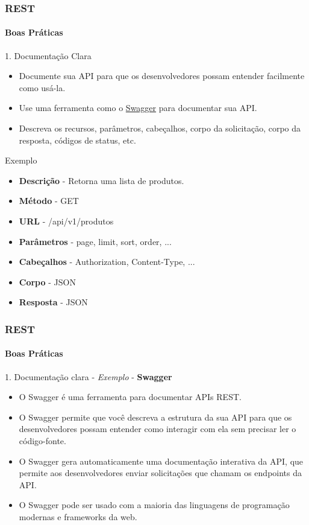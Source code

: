 \documentclass[
	9pt, %
	t, %
]{beamer}
\begin{document}
\begin{frame}
	\frametitle{REST}
	\framesubtitle{Boas Práticas}

	\begin{block}{1. Documentação Clara}
		\begin{itemize}
			\item Documente sua API para que os desenvolvedores possam entender facilmente como usá-la.
			\item Use uma ferramenta como o \href{https://swagger.io/}{Swagger} para documentar sua API.
			\item Descreva os recursos, parâmetros, cabeçalhos, corpo da solicitação, corpo da resposta, códigos de status, etc.
		\end{itemize}
	\end{block}

	\begin{exampleblock}{Exemplo}
		\begin{itemize}
			\item \textbf{Descrição} - Retorna uma lista de produtos.
			\item \textbf{Método} - GET
			\item \textbf{URL} - /api/v1/produtos
			\item \textbf{Parâmetros} - page, limit, sort, order, ...
			\item \textbf{Cabeçalhos} - Authorization, Content-Type, ...
			\item \textbf{Corpo} - JSON
			\item \textbf{Resposta} - JSON
		\end{itemize}
	\end{exampleblock}

\end{frame}

\begin{frame}
	\frametitle{REST}
	\framesubtitle{Boas Práticas}

	\begin{block}{1. Documentação clara - \textit{Exemplo} - \textbf{Swagger}}
		\begin{itemize}
			\item O Swagger é uma ferramenta para documentar APIs REST.
			\item O Swagger permite que você descreva a estrutura da sua API para que os desenvolvedores possam entender como interagir com ela sem precisar ler o código-fonte.
			\item O Swagger gera automaticamente uma documentação interativa da API, que permite aos desenvolvedores enviar solicitações que chamam os endpoints da API.
			\item O Swagger pode ser usado com a maioria das linguagens de programação modernas e frameworks da web.
		\end{itemize}
	\end{block}

\end{frame}
\end{document}
